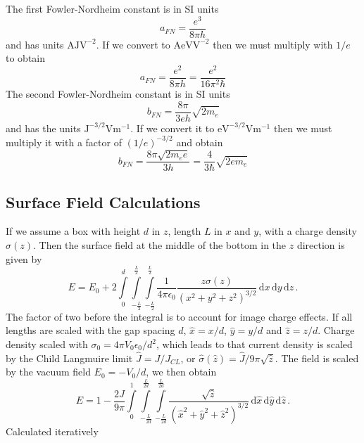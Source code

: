 \documentclass[a4paper,10pt]{article}
\newcommand{\ud}{\mathrm{d}}
\begin{document}
The first Fowler-Nordheim constant is in SI units
\begin{equation}\label{eq:a_fn}
 a_{FN} = \frac{e^3}{8\pi h}
\end{equation}
and has units \(\mathrm{A}\mathrm{J}\mathrm{V}^{-2}\). If we convert to \(\mathrm{A}\mathrm{eV}\mathrm{V}^{-2}\) then
we must multiply with \(1/e\) to obtain
\begin{equation}\label{eq:b_fn}
 a_{FN} = \frac{e^2}{8\pi h} = \frac{e^2}{16\pi^2 \hbar}
\end{equation}
The second Fowler-Nordheim constant is in SI units
\begin{equation}
  b_{FN} = \frac{8\pi}{3eh}\sqrt{2m_e}
\end{equation}
and has the units \(\mathrm{J}^{-3/2}\mathrm{V}\mathrm{m}^{-1}\). If we convert it to \(\mathrm{eV}^{-3/2}\mathrm{V}\mathrm{m}^{-1}\) then
we must multiply it with a factor of \((1/e)^{-3/2}\) and obtain
\begin{equation}
 b_{FN} = \frac{8\pi\sqrt{2m_e e}}{3h} = \frac{4}{3\hbar}\sqrt{2em_e}
\end{equation}

\subsection{Surface Field Calculations}
If we assume a box with height \(d\) in \(z\), length \(L\) in \(x\) and \(y\), with a charge density \(\sigma(z)\).
Then the surface field at the middle of the bottom in the \(z\) direction is given by
\begin{equation}
  E = E_0 + 2\int\limits_0^d\!\! \int\limits_{-\frac{L}{2}}^{\frac{L}{2}}\!\! \int\limits_{-\frac{L}{2}}^{\frac{L}{2}}\!\!
    \frac{1}{4\pi\epsilon_0} \frac{z \sigma(z)}{(x^2 + y^2 + z^2)^{3/2}}\, \ud x\, \ud y\, \ud z\, .
\end{equation}
The factor of two before the integral is to account for image charge effects.
If all lengths are scaled with the gap spacing \(d\), \(\hat{x} = x/d\), \(\hat{y} = y/d\) and \(\hat{z} = z/d\).
Charge density scaled with \(\sigma_0 = 4\pi V_0 \epsilon_0/d^2\), which leads to that current density is scaled
by the Child Langmuire limit \(\hat{J} = J/J_{CL}\), or \(\hat{\sigma}(\hat{z}) = \hat{J}/9\pi\sqrt{\hat{z}}\).
The field is scaled by the vacuum field \(E_0 = -V_0/d\), we then obtain
\begin{equation}
  E = 1 - \frac{2J}{9\pi}\int\limits_0^1\!\! \int\limits_{-\frac{L}{2d}}^{\frac{L}{2d}}\!\! \int\limits_{-\frac{L}{2d}}^{\frac{L}{2d}}\!\!
    \frac{\sqrt{\hat{z}}}{(\hat{x}^2 + \hat{y}^2 + \hat{z}^2)^{3/2}}\, \ud \hat{x}\, \ud \hat{y}\, \ud \hat{z}\, .
\end{equation}
Calculated iteratively
\end{document}
